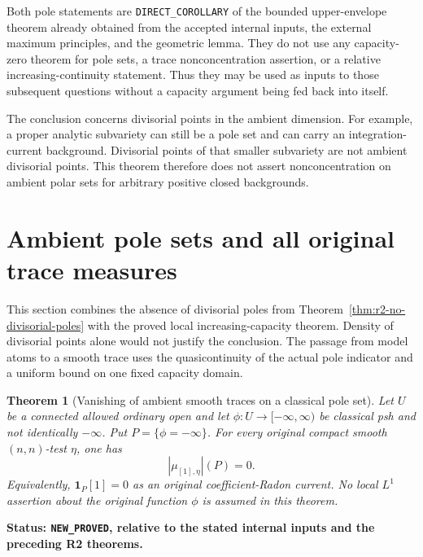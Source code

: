 \documentclass[11pt,a4paper]{article}
\numberwithin{equation}{section}
\newtheorem{theorem}{Theorem}[section]
\theoremstyle{definition}
\theoremstyle{remark}
\begin{document}
Both pole statements are \texttt{DIRECT\_COROLLARY} of the bounded
upper-envelope theorem already obtained from the accepted internal
inputs, the external maximum principles, and the geometric lemma.
They do not use any capacity-zero theorem for pole sets, a trace
nonconcentration assertion, or a relative increasing-continuity
statement. Thus they may be used as inputs to those subsequent
questions without a capacity argument being fed back into itself.

The conclusion concerns divisorial points in the ambient dimension.
For example, a proper analytic subvariety can still be a pole set and
can carry an integration-current background. Divisorial points of
that smaller subvariety are not ambient divisorial points. This
theorem therefore does not assert nonconcentration on ambient polar
sets for arbitrary positive closed backgrounds.



\section{Ambient pole sets and all original trace measures}
\label{sec:r2-ambient-polar-traces}

This section combines the absence of divisorial poles from
Theorem~\ref{thm:r2-no-divisorial-poles} with the proved local
increasing-capacity theorem. Density of divisorial points alone
would not justify the conclusion. The passage from model atoms
to a smooth trace uses the quasicontinuity of the actual pole
indicator and a uniform bound on one fixed capacity domain.

\begin{theorem}[Vanishing of ambient smooth traces on a classical pole set]
\label{thm:r2-ambient-polar-traces}
Let $U$ be a connected allowed ordinary open and let
$\phi:U\to[-\infty,\infty)$ be classical psh and not identically
$-\infty$. Put $P=\{\phi=-\infty\}$. For every original compact
smooth $(n,n)$-test $\eta$, one has
\[
 |\mu_{[1],\eta}|(P)=0.
\]
Equivalently, $\mathbf1_P[1]=0$ as an original coefficient-Radon
current. No local $L^1$ assertion about the original function
$\phi$ is assumed in this theorem.
\end{theorem}

\noindent\textbf{Status: \texttt{NEW\_PROVED}, relative to the
stated internal inputs and the preceding R2 theorems.}
\end{document}
